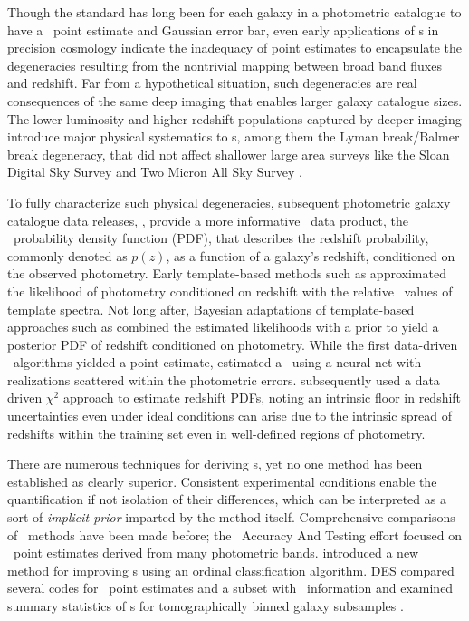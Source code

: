 Though the standard has long been for each galaxy in a photometric catalogue to have a \pz\ point estimate and Gaussian error bar, even early applications of \pz s in precision cosmology indicate the inadequacy of point estimates \citep{mandelbaum_precision_2008} to encapsulate the degeneracies resulting from the nontrivial mapping between broad band fluxes and redshift.
Far from a hypothetical situation, such degeneracies are real consequences of the same deep imaging that enables larger galaxy catalogue sizes.
The lower luminosity and higher redshift populations captured by deeper imaging introduce major physical systematics to \pz s, among them the Lyman break/Balmer break degeneracy, that did not affect shallower large area surveys like the Sloan Digital Sky Survey \citep[\textsc{SDSS},][]{york_sloan_2000} and Two Micron All Sky Survey \citep[\textsc{2MASS},][]{skrutskie_two_2006}.

To fully characterize such physical degeneracies, subsequent photometric galaxy catalogue data releases, \citep[e.~g.~][]{sheldon_photometric_2012, erben_cfhtlens_2013, de_jong_third_2017}, provide a more informative \pz\ data product, the \pz\ probability density function (PDF), that describes the redshift probability, commonly denoted as $p(z)$, as a function of a galaxy's redshift, conditioned on the observed photometry.
Early template-based methods such as \citet{fernandez-soto_new_1999} approximated the likelihood of photometry conditioned on redshift with the relative \chisq\ values of template spectra.
Not long after, Bayesian adaptations of template-based approaches such as \citet{benitez_bayesian_2000} combined the estimated likelihoods with a prior to yield a posterior PDF of redshift conditioned on photometry.
While the first data-driven \pz\ algorithms yielded a point estimate, \citet{firth_estimating_2003} estimated a \pzpdf\ using a neural net with realizations scattered within the photometric errors.  
\citet{wolf_bayesian_2009} subsequently used a data driven $\chi^{2}$ approach to estimate redshift PDFs, noting an intrinsic floor in redshift uncertainties even under ideal conditions can arise due to the intrinsic spread of redshifts within the training set even in well-defined regions of photometry.

There are numerous techniques for deriving \pzpdf s, yet no one method has been established as clearly superior.
Consistent experimental conditions enable the quantification if not isolation of their differences, which can be interpreted as a sort of \textit{implicit prior} imparted by the method itself.
Comprehensive comparisons of \pz\ methods have been made before; the \Pz\ Accuracy And Testing \citep[\textsc{PHAT},][]{hildebrandt_phat:_2010} effort focused on \pz\ point estimates derived from many photometric bands.
\citet{rau_accurate_2015} introduced a new method for improving \pzpdf s using an ordinal classification algorithm.
\textsc{DES} compared several codes for \pz\ point estimates and a subset with \pzpdf\ information \citep{sanchez_photometric_2014} and examined summary statistics of \pzpdf s for tomographically binned galaxy subsamples \citep{bonnett_redshift_2016}.

